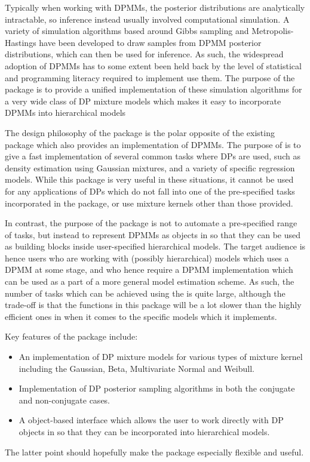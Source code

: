 \documentclass[nojss]{jss}
\begin{document}
Typically when working with DPMMs, the posterior distributions are analytically intractable, so inference instead usually involved computational simulation. A variety of simulation algorithms based around Gibbs sampling and Metropolis-Hastings have been developed to draw samples from DPMM posterior distributions, which can then be used for inference. As such, the widespread adoption of DPMMs has to some extent been held back by the level of statistical and programming literacy required to implement use them. The purpose of the  package is to provide a unified implementation of these simulation algorithms for a very wide class of DP mixture models which makes it easy to incorporate DPMMs into hierarchical models

The design philosophy of the  package is the polar opposite of the existing    package which also provides an implementation of DPMMs. The purpose of  is to give a fast implementation of several common tasks where DPs are used, such as density estimation using Gaussian mixtures, and a variety of specific regression models. While this package is very useful in these situations, it cannot be used for any applications of DPs which do not fall into one of the pre-specified tasks incorporated in the package, or use mixture kernels other than those provided.

In contrast, the purpose of the  package is not to automate a pre-specified range of tasks, but instead to represent DPMMs as objects in  so that they can be used as building blocks inside user-specified hierarchical models. The target audience is hence users who are working with  (possibly hierarchical) models which uses a DPMM at some stage, and who hence require a DPMM implementation which can be used as a part of a more general model estimation scheme.  As such, the number of tasks which can be achieved using the  is quite large, although the trade-off is that the functions in this package will be a lot slower than the highly efficient ones in  when it comes to the specific models which it implements.

Key features of the  package include:
\begin{itemize}
\item An implementation of DP mixture models for various types of mixture kernel including the Gaussian, Beta, Multivariate Normal and Weibull.
\item Implementation of DP posterior sampling algorithms in both the conjugate and non-conjugate cases.
\item A object-based interface which allows the user to work directly with DP objects in  so that they can be incorporated into hierarchical models.
\end{itemize}
The latter point should hopefully make the package especially flexible and useful.
\end{document}
